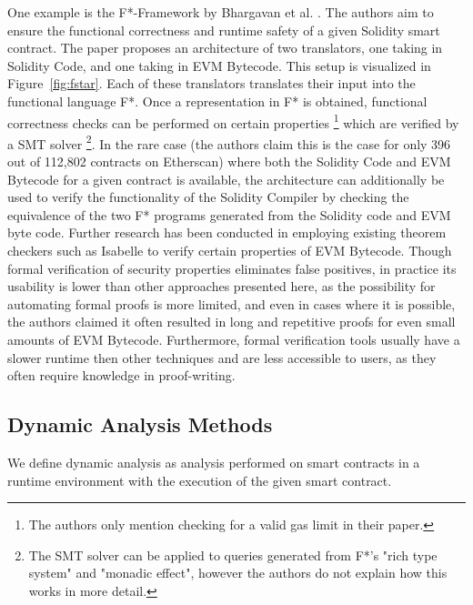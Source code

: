 \documentclass[letterpaper,twocolumn,10pt]{article}
\begin{document}
One example is the F*-Framework by Bhargavan et al. \cite{bhargavan_delignat-lavaud_fournet_gollamudi_gonthier_kobeissi_kulatova_rastogi_sibut-pinote_swamy_etal._2016}. The authors aim to ensure the functional correctness and runtime safety of a given Solidity smart contract. The paper proposes an architecture of two translators, one taking in Solidity Code, and one taking in EVM Bytecode. This setup is visualized in Figure~\ref{fig:fstar}. Each of these translators translates their input into the functional language F*. Once a representation in F* is obtained, functional correctness checks can be performed on certain properties \footnote{The authors only mention checking for a valid gas limit in their paper.} which are verified by a SMT solver \footnote{The SMT solver can be applied to queries generated from F*'s "rich type system" and "monadic effect", however the authors do not explain how this works in more detail.}. In the rare case (the authors claim this is the case for only 396 out of 112,802 contracts on Etherscan) where both the Solidity Code and EVM Bytecode for a given contract is available, the architecture can additionally be used to verify the functionality of the Solidity Compiler by checking the equivalence of the two F* programs generated from the Solidity code and EVM byte code.
Further research has been conducted in employing existing theorem checkers such as Isabelle\cite{amani_bégel_bortin_staples_2018} to verify certain properties of EVM Bytecode. Though formal verification of security properties eliminates false positives, in practice its usability is lower than other approaches presented here, as the possibility for automating formal proofs is more limited, and even in cases where it is possible, the authors claimed it often resulted in long and repetitive proofs for even small amounts of EVM Bytecode. Furthermore, formal verification tools usually have a slower runtime then other techniques and are less accessible to users, as they often require knowledge in proof-writing.


\subsection{Dynamic Analysis Methods}

We define dynamic analysis as analysis performed on smart contracts in a runtime environment with the execution of the given smart contract.
\end{document}
